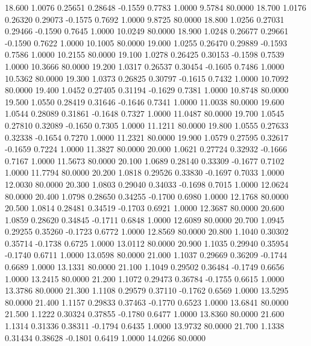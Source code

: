   18.600   1.0076   0.25651   0.28648  -0.1559   0.7783   1.0000   9.5784  80.0000
  18.700   1.0176   0.26320   0.29073  -0.1575   0.7692   1.0000   9.8725  80.0000
  18.800   1.0256   0.27031   0.29466  -0.1590   0.7645   1.0000  10.0249  80.0000
  18.900   1.0248   0.26677   0.29661  -0.1590   0.7622   1.0000  10.1005  80.0000
  19.000   1.0255   0.26470   0.29889  -0.1593   0.7586   1.0000  10.2155  80.0000
  19.100   1.0278   0.26425   0.30153  -0.1598   0.7539   1.0000  10.3666  80.0000
  19.200   1.0317   0.26537   0.30454  -0.1605   0.7486   1.0000  10.5362  80.0000
  19.300   1.0373   0.26825   0.30797  -0.1615   0.7432   1.0000  10.7092  80.0000
  19.400   1.0452   0.27405   0.31194  -0.1629   0.7381   1.0000  10.8748  80.0000
  19.500   1.0550   0.28419   0.31646  -0.1646   0.7341   1.0000  11.0038  80.0000
  19.600   1.0544   0.28089   0.31861  -0.1648   0.7327   1.0000  11.0487  80.0000
  19.700   1.0545   0.27810   0.32089  -0.1650   0.7305   1.0000  11.1211  80.0000
  19.800   1.0555   0.27633   0.32338  -0.1654   0.7270   1.0000  11.2321  80.0000
  19.900   1.0579   0.27595   0.32617  -0.1659   0.7224   1.0000  11.3827  80.0000
  20.000   1.0621   0.27724   0.32932  -0.1666   0.7167   1.0000  11.5673  80.0000
  20.100   1.0689   0.28140   0.33309  -0.1677   0.7102   1.0000  11.7794  80.0000
  20.200   1.0818   0.29526   0.33830  -0.1697   0.7033   1.0000  12.0030  80.0000
  20.300   1.0803   0.29040   0.34033  -0.1698   0.7015   1.0000  12.0624  80.0000
  20.400   1.0798   0.28650   0.34255  -0.1700   0.6980   1.0000  12.1768  80.0000
  20.500   1.0814   0.28481   0.34519  -0.1703   0.6921   1.0000  12.3687  80.0000
  20.600   1.0859   0.28620   0.34845  -0.1711   0.6848   1.0000  12.6089  80.0000
  20.700   1.0945   0.29255   0.35260  -0.1723   0.6772   1.0000  12.8569  80.0000
  20.800   1.1040   0.30302   0.35714  -0.1738   0.6725   1.0000  13.0112  80.0000
  20.900   1.1035   0.29940   0.35954  -0.1740   0.6711   1.0000  13.0598  80.0000
  21.000   1.1037   0.29669   0.36209  -0.1744   0.6689   1.0000  13.1331  80.0000
  21.100   1.1049   0.29502   0.36484  -0.1749   0.6656   1.0000  13.2415  80.0000
  21.200   1.1072   0.29473   0.36784  -0.1755   0.6615   1.0000  13.3786  80.0000
  21.300   1.1108   0.29579   0.37110  -0.1762   0.6569   1.0000  13.5295  80.0000
  21.400   1.1157   0.29833   0.37463  -0.1770   0.6523   1.0000  13.6841  80.0000
  21.500   1.1222   0.30324   0.37855  -0.1780   0.6477   1.0000  13.8360  80.0000
  21.600   1.1314   0.31336   0.38311  -0.1794   0.6435   1.0000  13.9732  80.0000
  21.700   1.1338   0.31434   0.38628  -0.1801   0.6419   1.0000  14.0266  80.0000

